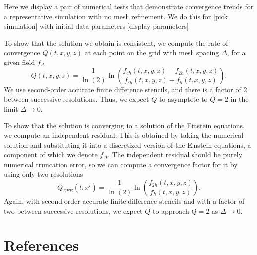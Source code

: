 \documentclass[12pt]{iopart}
\begin{document}
Here we display a pair of numerical tests that demonstrate convergence trends for a representative simulation with no mesh refinement.
We do this for [pick simulation] with initial data parameters [display parameters]

To show that the solution we obtain is consistent, we compute the rate of convergence $Q(t,x,y,z)$ at each point on the grid with mesh spacing $\Delta$, for a given field $f_\Delta$
\begin{equation}\label{eq:qconv}
Q(t,x,y,z)=\frac{1}{\ln(2)}\ln\left( \frac{f_{4h}(t,x,y,z)-f_{2h}(t,x,y,z)}{f_{2h}(t,x,y,z)-f_{h}(t,x,y,z)} \right).
\end{equation}
We use second-order accurate finite difference stencils, and there is a factor of 2 between successive resolutions.
Thus, we expect $Q$ to asymptote to $Q=2$ in the limit $\Delta\rightarrow0$.

To show that the solution is converging to a solution of the Einstein equations, we compute an independent residual. 
This is obtained by taking the numerical solution and substituting it into a discretized version of
the Einstein equations, a component of which we denote $f_\Delta$. 
The independent residual should be purely numerical truncation error, so we can compute a convergence factor for it by using only two resolutions
\begin{equation}\label{eq:qires}
Q_{EFE}(t,x^i)=\frac{1}{\ln(2)}\ln\left( \frac{f_{2h}(t,x,y,z)}{f_{h}(t,x,y,z)} \right).
\end{equation}
Again, with second-order accurate finite difference stencils and with a factor of two between successive resolutions, we expect $Q$ to approach $Q=2$ as $\Delta\rightarrow0$.



\section*{References}


\end{document}
